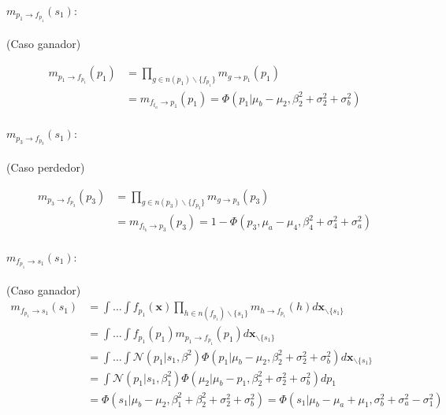 \documentclass[11pt,twoside,spanish]{report} %
\begin{document}
\paragraph{$m_{p_1 \rightarrow f_{p_1}}(s_1):$} (Caso ganador)

\begin{equation}
	\begin{split}
		m_{p_1 \rightarrow f_{p_1}}(p_1) &= \prod_{g \in n(p_1) \backslash  \{f_{p_1} \}} m_{g \rightarrow p_1} (p_1) \\
		&=m_{f_{t_a} \rightarrow p_1}(p_1) =  \Phi(p_1| \mu_b - \mu_2, \beta_2^2 + \sigma_2^2 + \sigma_b^2)
	\end{split}
\end{equation}


\paragraph{$m_{p_3 \rightarrow f_{p_3}}(s_1):$} (Caso perdedor)

\begin{equation}
	\begin{split}
		m_{p_3 \rightarrow f_{p_3}}(p_3) &= \prod_{g \in n(p_3) \backslash  \{f_{p_3} \}} m_{g \rightarrow p_3} (p_3) \\
		&= m_{f_{t_b} \rightarrow p_3}(p_3)=  1 - \Phi(p_3, \mu_a  - \mu_4, \beta_4^2 + \sigma_4^2 + \sigma_a^2)
	\end{split}
\end{equation}

\paragraph{$m_{f_{p_1} \rightarrow s_1}(s_1):$} (Caso ganador)
\begin{equation}
	\begin{split}
		m_{f_{p_1} \rightarrow s_1}(s_1) & = \int \dots \int f_{p_1}(\textbf{x}) \prod_{h \in n(f_{p_1}) \backslash \{s_1\} } m_{h \rightarrow f_{p_1}}(h)  d\textbf{x}_{\backslash \{s_1\} }  \\
		&= \int \dots \int f_{p_1}(p_1)m_{p_1 \rightarrow f_{p_1}}(p_1) d\textbf{x}_{\backslash \{s_1\} }  \\
		&= \int \dots \int \mathcal{N}(p_1| s_1, \beta^2)  \Phi(p_1| \mu_b - \mu_2, \beta_2^2 + \sigma_2^2 + \sigma_b^2 )  d\textbf{x}_{\backslash \{s_1\} }\\
		&= \int \mathcal{N}(p_1| s_1, \beta_1^2)  \Phi(\mu_2| \mu_b -  p_1, \beta_2^2 + \sigma_2^2 + \sigma_b^2)  dp_1 \\
		&= \Phi(s_1| \mu_b - \mu_2, \beta_1^2+\beta_2^2 + \sigma_2^2 + \sigma_b^2) =\Phi(s_1| \mu_b - \mu_a + \mu_1, \sigma_b^2 +\sigma_a^2 - \sigma_1^2 )
	\end{split}
\end{equation}
\end{document}
